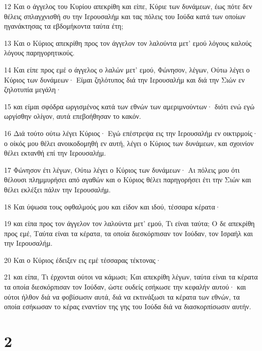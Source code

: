 \par 12 Και ο άγγελος του Κυρίου απεκρίθη και είπε, Κύριε των δυνάμεων, έως πότε δεν θέλεις σπλαγχνισθή συ την Ιερουσαλήμ και τας πόλεις του Ιούδα κατά των οποίων ηγανάκτησας τα εβδομήκοντα ταύτα έτη;
\par 13 Και ο Κύριος απεκρίθη προς τον άγγελον τον λαλούντα μετ' εμού λόγους καλούς λόγους παρηγορητικούς.
\par 14 Και είπε προς εμέ ο άγγελος ο λαλών μετ' εμού, Φώνησον, λέγων, Ούτω λέγει ο Κύριος των δυνάμεων· Είμαι ζηλότυπος διά την Ιερουσαλήμ και διά την Σιών εν ζηλοτυπία μεγάλη·
\par 15 και είμαι σφόδρα ωργισμένος κατά των εθνών των αμεριμνούντων· διότι ενώ εγώ ωργίσθην ολίγον, αυτά επεβοήθησαν το κακόν.
\par 16 Διά τούτο ούτω λέγει Κύριος· Εγώ επέστρεψα εις την Ιερουσαλήμ εν οικτιρμοίς· ο οίκός μου θέλει ανοικοδομηθή εν αυτή, λέγει ο Κύριος των δυνάμεων, και σχοινίον θέλει εκτανθή επί την Ιερουσαλήμ.
\par 17 Φώνησον έτι λέγων, Ούτω λέγει ο Κύριος των δυνάμεων· Αι πόλεις μου ότι θέλουσι πλημμυρήσει από αγαθών και ο Κύριος θέλει παρηγορήσει έτι την Σιών και θέλει εκλέξει πάλιν την Ιερουσαλήμ.
\par 18 Και ύψωσα τους οφθαλμούς μου και είδον και ιδού, τέσσαρα κέρατα·
\par 19 και είπα προς τον άγγελον τον λαλούντα μετ' εμού, Τι είναι ταύτα; Ο δε απεκρίθη προς εμέ, Ταύτα είναι τα κέρατα, τα οποία διεσκόρπισαν τον Ιούδαν, τον Ισραήλ και την Ιερουσαλήμ.
\par 20 Και ο Κύριος έδειξεν εις εμέ τέσσαρας τέκτονας·
\par 21 και είπα, Τι έρχονται ούτοι να κάμωσι; Και απεκρίθη λέγων, ταύτα είναι τα κέρατα τα οποία διεσκόρπισαν τον Ιούδαν, ώστε ουδείς εσήκωσε την κεφαλήν αυτού· και ούτοι ήλθον διά να φοβίσωσιν αυτά, διά να εκτινάξωσι τα κέρατα των εθνών, τα οποία εσήκωσαν το κέρας εναντίον της γης του Ιούδα διά να διασκορπίσωσιν αυτήν.

\chapter{2}

